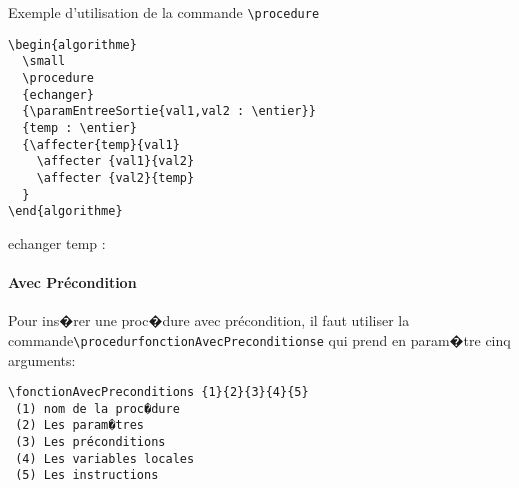 \documentclass[a4paper,12pt]{report}
\begin{document}
Exemple d'utilisation de la commande \texttt{\textbackslash procedure}
\begin{lstlisting}
\begin{algorithme}
  \small
  \procedure
  {echanger}
  {\paramEntreeSortie{val1,val2 : \entier}}
  {temp : \entier}
  {\affecter{temp}{val1}
    \affecter {val1}{val2}
    \affecter {val2}{temp}
  }
\end{algorithme}
\end{lstlisting}
\begin{algorithme}
    \small
    \procedure
    {echanger}
    {}
    {temp : \entier}
    {
    }
  \end{algorithme}

\paragraph{Avec Précondition}
Pour ins�rer une proc�dure avec précondition, il faut utiliser la commande\texttt{\textbackslash procedurfonctionAvecPreconditionse} qui prend en param�tre cinq arguments:
\begin{lstlisting}
\fonctionAvecPreconditions {1}{2}{3}{4}{5}
 (1) nom de la proc�dure
 (2) Les param�tres
 (3) Les préconditions
 (4) Les variables locales
 (5) Les instructions
\end{lstlisting}
\end{document}
